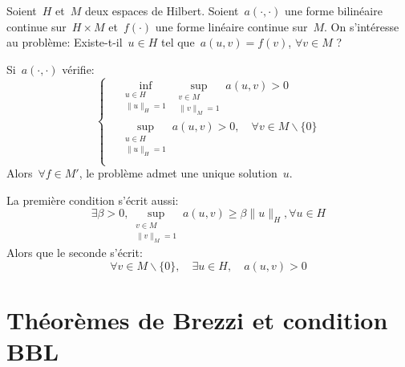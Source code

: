 \medskip
\begin{theoreme}

Soient~$H$ et~$M$ deux espaces de Hilbert.
Soient~$a(\cdot,\cdot)$ une forme bilinéaire continue sur~$H \times M$
et~$f(\cdot)$ une forme linéaire continue sur~$M$.
On s'intéresse au problème: Existe-t-il~$u\in H$ tel que~$a(u,v)=f(v)$, $\forall v\in M$ ?

Si~$a(\cdot,\cdot)$ vérifie:
\begin{equation}\left\{
\begin{aligned}
&\displaystyle\inf_{\substack{u\in H\\\|u\|_H=1}} \sup_{\substack{v\in M\\\|v\|_M=1}} a(u,v) > 0\\[+2mm]
&\displaystyle\sup_{\substack{u\in H\\\|u\|_H=1}} a(u,v) > 0, \quad\forall v\in M\backslash\{0\}\\
\end{aligned}\right.
\end{equation}
Alors~$\forall f\in M'$, le problème admet une unique solution~$u$.
\end{theoreme}

\medskip
La première condition s'écrit aussi:
\begin{equation}
\exists \beta > 0, \sup_{\substack{v\in M\\\|v\|_M=1}} a(u,v) \ge \beta \|u\|_H, \forall u\in H
\end{equation}
Alors que le seconde s'écrit:
\begin{equation}
\forall v\in M\backslash\{0\},\quad \exists u\in H,\quad a(u,v)>0
\end{equation}


\medskip
{}


\section{Théorèmes de Brezzi et condition BBL}\label{Sec-ThBrezzi}

